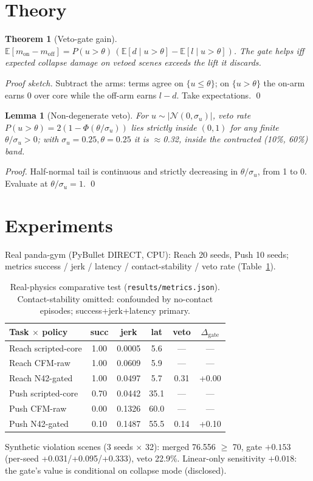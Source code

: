 \documentclass{article}
\newtheorem{theorem}{Theorem}
\newtheorem{lemma}{Lemma}
\begin{document}
\section{Theory}
\begin{theorem}[Veto-gate gain]
$\mathbb{E}[m_{\text{on}}-m_{\text{off}}]
= P(u>\theta)\,(\mathbb{E}[d\mid u>\theta]-\mathbb{E}[l\mid u>\theta])$.
The gate helps iff expected collapse damage on vetoed scenes exceeds the lift it discards.
\end{theorem}
\textit{Proof sketch.} Subtract the arms: terms agree on $\{u\le\theta\}$; on
$\{u>\theta\}$ the on-arm earns $0$ over core while the off-arm earns $l-d$.
Take expectations. \qed
\begin{lemma}[Non-degenerate veto]
For $u\sim\lvert\mathcal{N}(0,\sigma_u)\rvert$, veto rate
$P(u>\theta)=2(1-\Phi(\theta/\sigma_u))$ lies strictly inside $(0,1)$ for any
finite $\theta/\sigma_u>0$; with $\sigma_u=0.25,\theta=0.25$ it is $\approx$0.32,
inside the contracted (10\%, 60\%) band.
\end{lemma}
\textit{Proof.} Half-normal tail is continuous and strictly decreasing in
$\theta/\sigma_u$, from 1 to 0. Evaluate at $\theta/\sigma_u=1$. \qed
\section{Experiments}
Real panda-gym (PyBullet DIRECT, CPU): Reach 20 seeds, Push 10 seeds; metrics
success / jerk / latency / contact-stability / veto rate (Table~\ref{tab:real}).
\begin{table}[h]\centering
\begin{tabular}{lccccc}\toprule
Task $\times$ policy & succ & jerk & lat & veto & $\Delta_{\text{gate}}$ \\\midrule
Reach scripted-core & 1.00 & 0.0005 & 5.6 & — & — \\
Reach CFM-raw & 1.00 & 0.0609 & 5.9 & — & — \\
Reach N42-gated & 1.00 & 0.0497 & 5.7 & 0.31 & +0.00 \\
Push scripted-core & 0.70 & 0.0442 & 35.1 & — & — \\
Push CFM-raw & 0.00 & 0.1326 & 60.0 & — & — \\
Push N42-gated & 0.10 & 0.1487 & 55.5 & 0.14 & +0.10 \\\bottomrule
\end{tabular}
\caption{Real-physics comparative test (\texttt{results/metrics.json}). Contact-stability omitted: confounded by no-contact episodes; success+jerk+latency primary.}
\label{tab:real}
\end{table}
Synthetic violation scenes (3 seeds $\times$ 32): merged 76.556 $\ge$ 70, gate
$+0.153$ (per-seed +0.031/+0.095/+0.333), veto 22.9\%. Linear-only sensitivity
$+0.018$: the gate's value is conditional on collapse mode (disclosed).
\end{document}
